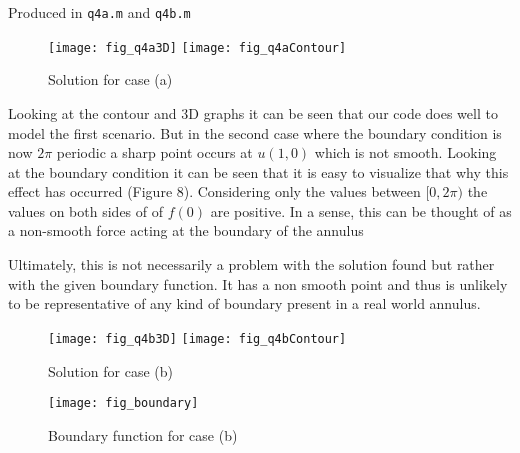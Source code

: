 \documentclass{article}
\begin{document}
\begin{enumerate}
	Produced in \texttt{q4a.m} and \texttt{q4b.m}
	
	\begin{figure}[h!]
		\centering
		\texttt{[image: fig\_q4a3D]}
		\texttt{[image: fig\_q4aContour]}
		\caption{Solution for case (a)}
	\end{figure}
	

	Looking at the contour and 3D graphs it can be seen that our code does well to model the first scenario. But in the second case where the boundary condition is now $2\pi$ periodic a sharp point occurs at $u(1,0)$ which is not smooth. Looking at the boundary condition it can be seen that it is easy to visualize that why this effect has occurred (Figure 8). Considering only the values between $[0,2\pi)$ the values on both sides of of $f(0)$ are positive. In a sense, this can be thought of as a non-smooth force acting at the boundary of the annulus
	
	Ultimately, this is not necessarily a problem with the solution found but rather with the given boundary function. It has a non smooth point and thus is unlikely to be representative of any kind of boundary present in a real world annulus.

	\begin{figure}[h!]
		\centering
		\texttt{[image: fig\_q4b3D]}
		\texttt{[image: fig\_q4bContour]}
		\caption{Solution for case (b)}
	\end{figure}
	
	\begin{figure}[h!]
		\centering
		\texttt{[image: fig\_boundary]}
		\caption{Boundary function for case (b)}
	\end{figure}
	
	
\end{enumerate}

%
%
\end{document}
